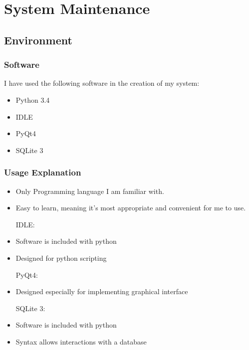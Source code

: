 \chapter{System Maintenance}

\section{Environment}

\subsection{Software}

I have used the following software in the creation of my system:

\begin{itemize}
    \item Python 3.4
    \item IDLE
    \item PyQt4
    \item SQLite 3
\end{itemize}

\subsection{Usage Explanation}

\begin{itemize}

Python 3.4:

    \item Only Programming language I am familiar with.
    \item Easy to learn, meaning it's most appropriate and convenient for me to use.

IDLE:
    
    \item Software is included with python
    \item Designed for python scripting

PyQt4:

    \item Designed especially for implementing graphical interface

SQLite 3:

    \item Software is included with python
    \item Syntax allows interactions with a database

\end{itemize}


